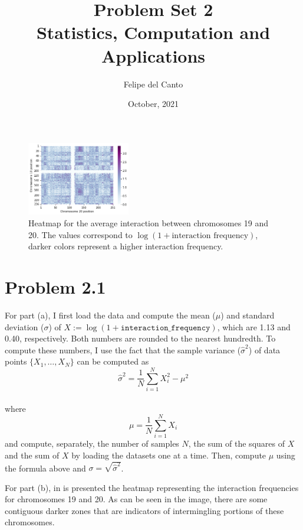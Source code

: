 \documentclass[11pt, english, twocolumn]{article}
\title{\bf Problem Set 2 \\ Statistics, Computation and
Applications\\[-1ex]}
\author{Felipe del Canto}
\date{October, 2021}
\begin{document}
    
\maketitle
   
\begin{figure}[b]
	\centering
	\includegraphics[width=0.4\textwidth]{19_20_heatmap}
	\caption{Heatmap for the average interaction between chromosomes 19 and 20. The values correspond to $\log(1 + \text{interaction frequency})$, darker colors represent a higher interaction frequency.}
	\label{fig:19-20-heatmap}
\end{figure}

\section*{Problem 2.1}
For part (a), I first load the data and compute the mean ($\mu$) and standard deviation ($\sigma$) of $X := \log(1+ \texttt{interaction\_frequency})$, which are 1.13 and 0.40, respectively. Both numbers are rounded to the nearest hundredth. To compute these numbers, I use the fact that the sample variance ($\hat{\sigma}^{2}$) of data points $\{X_{1}, \ldots, X_{N}\}$ can be computed as
	$$\hat{\sigma}^{2} = \frac{1}{N}\sum_{i=1}^{N} X_{i}^{2} - \mu^{2}$$\\
where
	$$\mu = \frac{1}{N} \sum_{i=1}^{N} X_{i}$$ 
and compute, separately, the number of samples $N$, the sum of the squares of $X$ and the sum of $X$ by loading the datasets one at a time. Then, compute $\mu$ using the formula above and $\sigma = \sqrt{\hat{\sigma}^{2}}$.

For part (b), in  is presented the heatmap representing the interaction frequencies for chromosomes 19 and 20. As can be seen in the image, there are some contiguous darker zones that are indicators of intermingling portions of these chromosomes.
\end{document}
